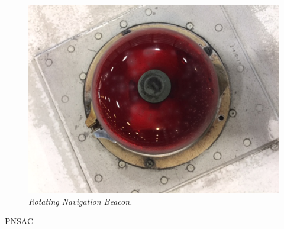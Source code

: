 \begin{figure}[httb]
   \vspace{2em}
   \centering
   \includegraphics[scale=0.5]{RotatingNavigationBeacon-scaled.png}
   \caption*{\small \em Rotating Navigation Beacon.}
   \label{fig:stab-one}
\end{figure}





\begin{footnotesize}
    \raggedleft PNSAC\\
\end{footnotesize}



